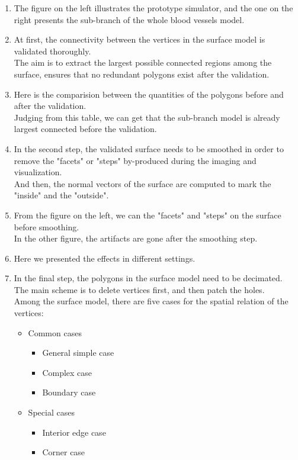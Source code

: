 \documentclass{article}
\begin{document}
\begin{enumerate}
\item The figure on the left illustrates the prototype simulator, and the one on the right presents the sub-branch of the whole blood vessels model.


\item At first, the connectivity between the vertices in the surface model is validated thoroughly.\\
      The aim is to extract the largest possible connected regions among the surface, ensures that no redundant polygons exist after the validation.

\item Here is the comparision between the quantities of the polygons before and after the validation. \\
      Judging from this table, we can get that the sub-branch model is already largest connected before the validation.

\item In the second step, the validated surface needs to be smoothed in order to remove the "facets" or "steps" by-produced during the imaging and visualization. \\
      And then, the normal vectors of the surface are computed to mark the "inside" and the "outside".

\item From the figure on the left, we can the "facets" and "steps" on the surface before smoothing. \\
      In the other figure, the artifacts are gone after the smoothing step.

\item Here we presented the effects in different settings.\\
      
\item In the final step, the polygons in the surface model need to be decimated.\\
      The main scheme is to delete vertices first, and then patch the holes.\\
	  Among the surface model, there are five cases for the spatial relation of the vertices:
	  \begin{itemize}
      \item Common cases
      \begin{itemize}
      \item General simple case
      \item Complex case
      \item Boundary case
      \end{itemize}
      \end{itemize}
      \begin{itemize}
      \item Special cases
      \begin{itemize}
      \item Interior edge case
      \item Corner case
      \end{itemize}
      \end{itemize}


\end{enumerate}
\end{document}
